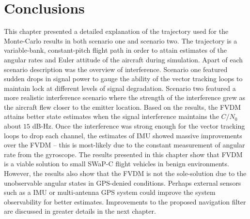 \section{\textbf{Conclusions}}

This chapter presented a detailed explanation of the trajectory used for the Monte-Carlo results in both scenario one and scenario two. The trajectory is a variable-bank, constant-pitch flight path in order to attain estimates of the angular rates and Euler attitude of the aircraft during simulation. Apart of each scenario description was the overview of interference. Scenario one featured sudden drops in signal power to gauge the ability of the vector tracking loops to maintain lock at different levels of signal degradation. Scenario two featured a more realistic interference scenario where the strength of the interference grew as the aircraft flew closer to the emitter location. Based on the results, the FVDM attains better state estimates when the signal interference maintains the \(C/N_0\) about \(15\) dB-Hz. Once the interference was strong enough for the vector tracking loops to drop each channel, the estimates of IMU showed massive improvements over the FVDM {--} this is most-likely due to the constant measurement of angular rate from the gyroscope. The results presented in this chapter show that FVDM is a viable solution to small SWaP-C flight vehicles in benign environments. However, the results also show that the FVDM is not the sole-solution due to the unobservable angular states in GPS-denied conditions. Perhaps external sensors such as a IMU or multi-antenna GPS system could improve the system observability for better estimates. Improvements to the proposed navigation filter are discussed in greater details in the next chapter.